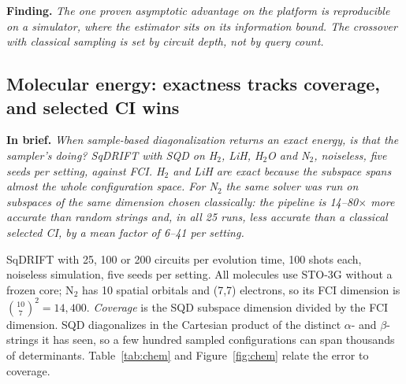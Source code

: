 \documentclass[11pt,a4paper]{article}
\newcommand{\finding}[1]{\par\smallskip\noindent\textbf{Finding.} \emph{#1}\par\smallskip}
\newcommand{\inbrief}[1]{\par\smallskip\noindent\textbf{In brief.} \emph{#1}\par\medskip}
\begin{document}
\finding{The one proven asymptotic advantage on the platform is reproducible
on a simulator, where the estimator sits on its information bound. The
crossover with classical sampling is set by circuit depth, not by query
count.}

\subsection{Molecular energy: exactness tracks coverage, and selected CI wins}
\label{sec:res-chem}

\inbrief{When sample-based diagonalization returns an exact energy, is that
the sampler's doing? SqDRIFT with SQD on H$_2$, LiH, H$_2$O and N$_2$,
noiseless, five seeds per setting, against FCI. H$_2$ and LiH are exact
because the subspace spans almost the whole configuration space. For N$_2$
the same solver was run on subspaces of the same dimension chosen
classically: the pipeline is 14--80$\times$ more accurate than random
strings and, in all 25 runs, less accurate than a classical selected CI, by
a mean factor of 6--41 per setting.}

SqDRIFT with 25, 100 or 200 circuits per evolution time, 100 shots each,
noiseless simulation, five seeds per setting. All molecules use STO-3G
without a frozen core; N$_2$ has 10 spatial orbitals and (7,7) electrons, so
its FCI dimension is $\binom{10}{7}^2 = 14{,}400$. \emph{Coverage} is the SQD
subspace dimension divided by the FCI dimension. SQD diagonalizes in the
Cartesian product of the distinct $\alpha$- and $\beta$-strings it has seen,
so a few hundred sampled configurations can span thousands of determinants.
Table~\ref{tab:chem} and Figure~\ref{fig:chem} relate the error to coverage.
\end{document}
